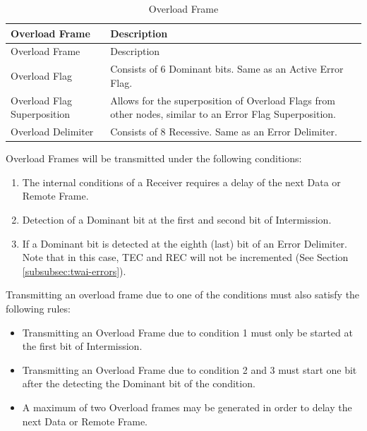 \documentclass[main\_\_EN.tex]{subfiles}
\begin{document}
\begin{longtable}[c]{|p{4cm}|p{11cm}|}

  \caption{Overload Frame}
  \label{table:Overload_Frames}
  \\\hline
  \rowcolor{lightgray}
  Overload Frame & Description
  \\\hline
  \endfirsthead

  \hline
  \rowcolor{lightgray}
   Overload Frame & Description
   \\\hline
  \endhead
  \endfoot
  \hline
  \endlastfoot

    Overload Flag & Consists of 6 Dominant bits. Same as an Active Error Flag.
          \\\hline
    Overload Flag Superposition & Allows for the superposition of Overload Flags from other nodes, similar to an Error Flag Superposition.
           \\\hline
    Overload Delimiter & Consists of 8 Recessive. Same as an Error Delimiter.                                           \\\hline

\end{longtable}

Overload Frames will be transmitted under the following conditions:
\begin{enumerate}
    \item The internal conditions of a Receiver requires a delay of the next Data or Remote Frame.
    \item Detection of a Dominant bit at the first and second bit of Intermission.
    \item If a Dominant bit is detected at the eighth (last) bit of an Error Delimiter. Note that in this case, TEC and REC will not be incremented (See Section \ref{subsubsec:twai-errors}).
\end{enumerate}
Transmitting an overload frame due to one of the conditions must also satisfy the following rules:
\begin{itemize}
    \item Transmitting an Overload Frame due to condition 1 must only be started at the first bit of Intermission.
    \item Transmitting an Overload Frame due to condition 2 and 3 must start one bit after the detecting the Dominant bit of the condition.
    \item A maximum of two Overload frames may be generated in order to delay the next Data or Remote Frame.
\end{itemize}
\end{document}
